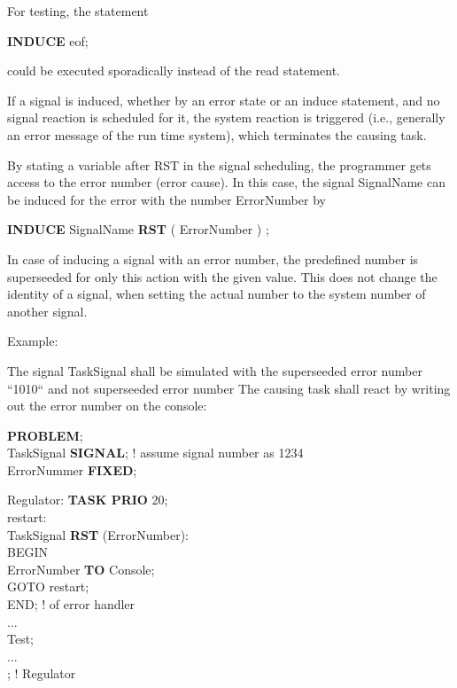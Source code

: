 For testing, the statement

{\bf INDUCE} eof;

could be executed sporadically instead of the read statement.



If a signal is induced, whether by an error state or an induce
statement, and no signal reaction is scheduled for it, the system
reaction is triggered (i.e., generally an error message of the run time
system), which terminates the causing task.

By stating a variable after RST in the signal scheduling, the programmer
gets access to the error number (error cause). In this case, the signal
SignalName can be induced for the error with the number ErrorNumber by

{\bf INDUCE} SignalName {\bf RST} ( ErrorNumber ) ;


In case of inducing a signal with an error number, the predefined number
is superseeded for only this action with the given value. This does not change
the identity of a signal, when setting the actual number to the
system number of another signal.  



Example:

The signal TaskSignal shall be simulated with the 
superseeded error number ``1010`` and not superseeded error number
The causing task shall react by writing out the error
number on the console:

{\bf PROBLEM};\\
 TaskSignal {\bf SIGNAL};  ! assume signal number as 1234\\
 ErrorNummer {\bf FIXED};

Regulator: {\bf TASK PRIO} 20;\\
restart:\\
 TaskSignal {\bf RST} (ErrorNumber):\\
\x \x BEGIN \\
\x \x {} ErrorNumber {\bf TO} Console;\\
\x \x \x GOTO restart;\\
\x \x END;  ! of error handler \\
\x \x ...\\
 Test;\\
\x \x ...\\
; ! Regulator

